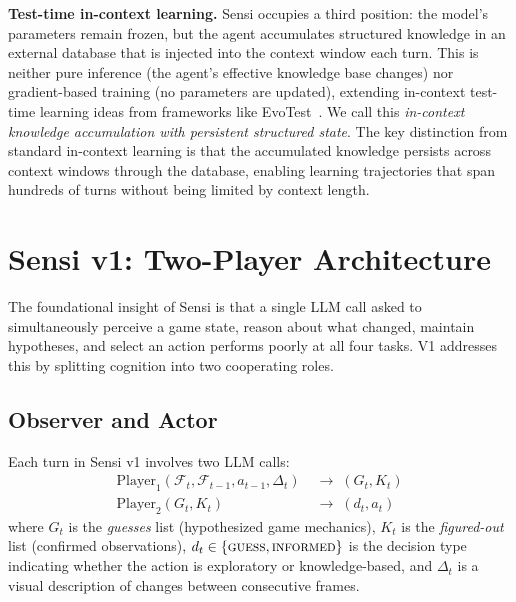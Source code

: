 \documentclass[11pt,letterpaper]{article}
\begin{document}
\textbf{Test-time in-context learning.} Sensi occupies a third position: the model's parameters remain frozen, but the agent accumulates structured knowledge in an external database that is injected into the context window each turn. This is neither pure inference (the agent's effective knowledge base changes) nor gradient-based training (no parameters are updated), extending in-context test-time learning ideas from frameworks like EvoTest~\citep{he2025evotest}. We call this \emph{in-context knowledge accumulation with persistent structured state}. The key distinction from standard in-context learning is that the accumulated knowledge persists across context windows through the database, enabling learning trajectories that span hundreds of turns without being limited by context length.

\section{Sensi v1: Two-Player Architecture}
\label{sec:v1}

The foundational insight of Sensi is that a single LLM call asked to simultaneously perceive a game state, reason about what changed, maintain hypotheses, and select an action performs poorly at all four tasks. V1 addresses this by splitting cognition into two cooperating roles.

\subsection{Observer and Actor}

Each turn in Sensi v1 involves two LLM calls:
\begin{align}
  \text{Player}_1(\mathcal{F}_t, \mathcal{F}_{t-1}, a_{t-1}, \Delta_t) &\;\rightarrow\; (G_t, K_t) \label{eq:player1} \\
  \text{Player}_2(G_t, K_t) &\;\rightarrow\; (d_t, a_t) \label{eq:player2}
\end{align}
where $G_t$ is the \emph{guesses} list (hypothesized game mechanics), $K_t$ is the \emph{figured-out} list (confirmed observations), $d_t \in \{\textsc{guess}, \textsc{informed}\}$ is the decision type indicating whether the action is exploratory or knowledge-based, and $\Delta_t$ is a visual description of changes between consecutive frames.
\end{document}
